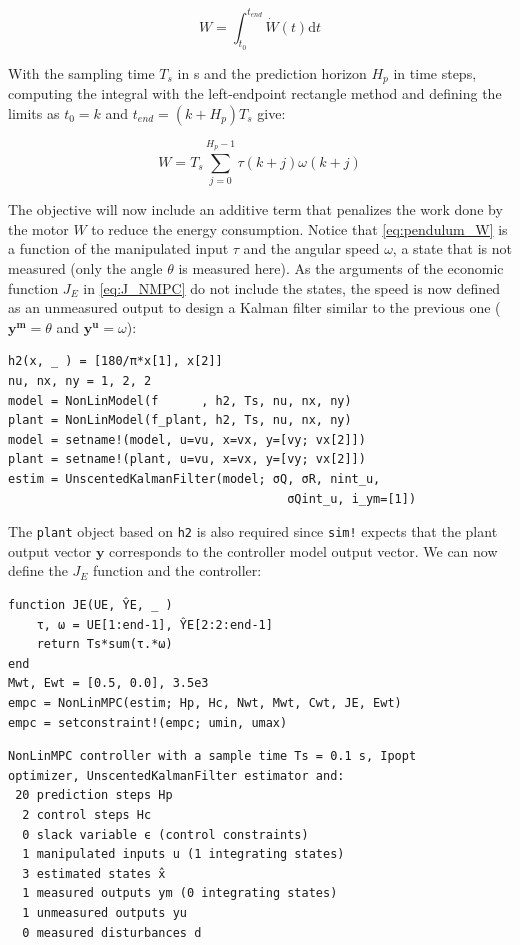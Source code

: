 \begin{equation}
W = \int_{t_0}^{t_{end}} \dot{W}(t) \mathrm{d}t 
\end{equation}

With the sampling time $T_s$ in \si{\second} and the prediction horizon $H_p$ in time steps, computing the integral with the left-endpoint rectangle method and defining the limits as $t_0=k$ and $t_{end} = (k + H_p) T_s$ give:

\begin{equation}\label{eq:pendulum_W}
W = T_s \sum_{j = 0}^{H_p - 1} \tau(k+j) \omega(k+j) 
\end{equation}

The objective will now include an additive term that penalizes the work done by the motor $W$ to reduce the energy consumption. Notice that \eqref{eq:pendulum_W} is a function of the manipulated input $\tau$ and the angular speed $\omega$, a state that is not measured (only the angle $\theta$ is measured here). As the arguments of the economic function $J_E$ in \eqref{eq:J_NMPC} do not include the states, the speed is now defined as an unmeasured output to design a Kalman filter similar to the previous one ($\mathbf{y^m} = \theta$ and $\mathbf{y^u} = \omega$):

\begin{verbatim}
h2(x, _ ) = [180/π*x[1], x[2]]
nu, nx, ny = 1, 2, 2
model = NonLinModel(f      , h2, Ts, nu, nx, ny)
plant = NonLinModel(f_plant, h2, Ts, nu, nx, ny)
model = setname!(model, u=vu, x=vx, y=[vy; vx[2]])
plant = setname!(plant, u=vu, x=vx, y=[vy; vx[2]])
estim = UnscentedKalmanFilter(model; σQ, σR, nint_u, 
                                       σQint_u, i_ym=[1])
\end{verbatim}

The \texttt{plant} object based on \texttt{h2} is also required since \texttt{sim!} expects that the plant output vector $\mathbf{y}$ corresponds to the controller model output vector. We can now define the $J_E$ function and the controller:

\begin{verbatim}
function JE(UE, ŶE, _ )
    τ, ω = UE[1:end-1], ŶE[2:2:end-1]
    return Ts*sum(τ.*ω)
end
Mwt, Ewt = [0.5, 0.0], 3.5e3
empc = NonLinMPC(estim; Hp, Hc, Nwt, Mwt, Cwt, JE, Ewt)
empc = setconstraint!(empc; umin, umax)
\end{verbatim}
\spacerepl
\begin{verbatim}
NonLinMPC controller with a sample time Ts = 0.1 s, Ipopt
optimizer, UnscentedKalmanFilter estimator and:
 20 prediction steps Hp
  2 control steps Hc
  0 slack variable ϵ (control constraints)
  1 manipulated inputs u (1 integrating states)
  3 estimated states x̂
  1 measured outputs ym (0 integrating states)
  1 unmeasured outputs yu
  0 measured disturbances d
\end{verbatim}

